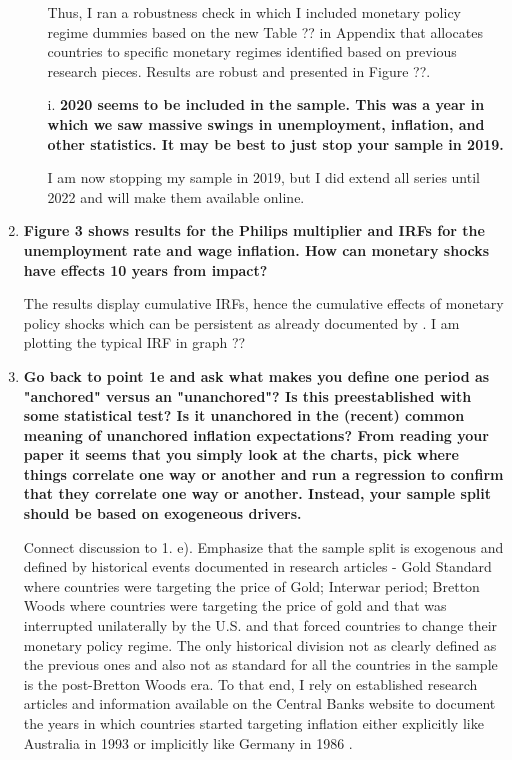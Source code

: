 \documentclass[12pt]{article}
\begin{document}
\begin{enumerate}
\begin{itemize}
Thus, I ran a robustness check in which I included monetary policy regime dummies based on the new Table ?? in Appendix that allocates countries to specific monetary regimes identified based on previous research pieces. Results are robust and presented in Figure ??.


    \item[i.] \textbf{2020 seems to be included in the sample. This was a year in which we saw massive swings in unemployment, inflation, and other statistics. It may be best to just stop your sample in 2019.}

I am now stopping my sample in 2019, but I did extend all series until 2022 and will make them available online.

\end{itemize}



\item \textbf{Figure 3 shows results for the Philips multiplier and IRFs for the unemployment rate and wage inflation. How can monetary shocks have effects 10 years from impact?} 

The results display cumulative IRFs, hence the cumulative effects of monetary policy shocks which can be persistent as already documented by \cite{Jorda2019}. I am plotting the typical IRF in graph ??

\item \textbf{Go back to point 1e and ask what makes you define one period as "anchored" versus an "unanchored"? Is this preestablished with some statistical test? Is it unanchored in the (recent) common meaning of unanchored inflation expectations? From reading your paper it seems that you simply look at the charts, pick where things correlate one way or another and run a regression to confirm that they correlate one way or another. Instead, your sample split should be based on exogeneous drivers.} 

Connect discussion to 1. e). Emphasize that the sample split is exogenous and defined by historical events documented in research articles - Gold Standard where countries were targeting the price of Gold; Interwar period; Bretton Woods where countries were targeting the price of gold and that was interrupted unilaterally by the U.S. and that forced countries to change their monetary policy regime. The only historical division not as clearly defined as the previous ones and also not as standard for all the countries in the sample is the post-Bretton Woods era. To that end, I rely on established research articles and information available on the Central Banks website to document the years in which countries started targeting inflation either explicitly like Australia in 1993 or implicitly like Germany in 1986 \citep{vonHagen1999}.


\end{enumerate}
\end{document}
